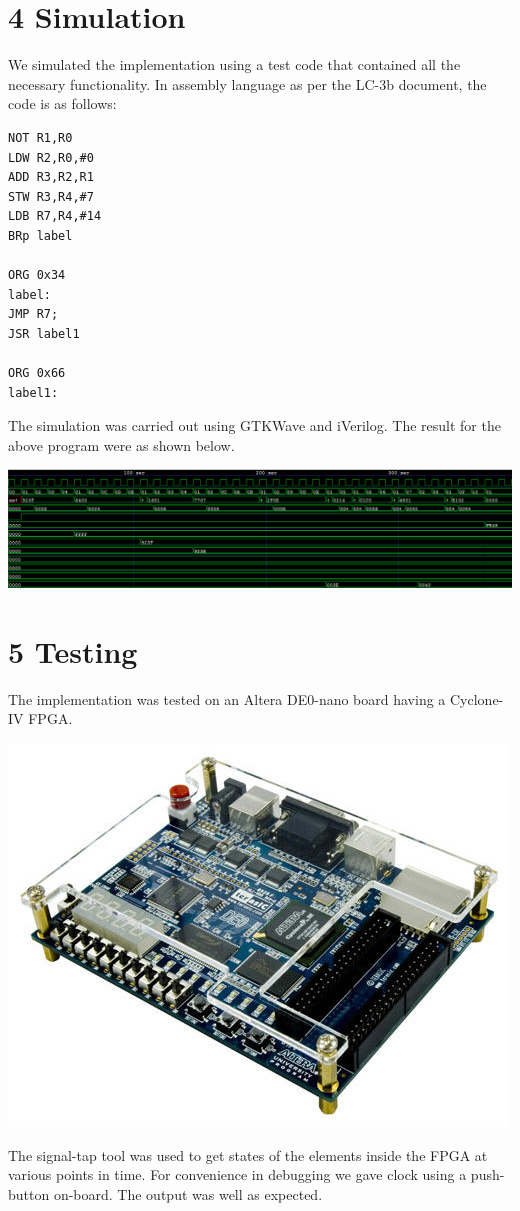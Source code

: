 \documentclass[11pt]{report}
\begin{document}
\section*{4 Simulation}
We simulated the implementation using a test code that contained all the necessary functionality. In assembly language as per the LC-3b document, the code is as follows:

\begin{lstlisting}
NOT R1,R0
LDW R2,R0,#0
ADD R3,R2,R1
STW R3,R4,#7
LDB R7,R4,#14
BRp label

ORG 0x34
label:
JMP R7;
JSR label1

ORG 0x66
label1:
\end{lstlisting}

The simulation was carried out using GTKWave and iVerilog. The result for the above program were as shown below.
\newline
\centerline{\includegraphics[scale=0.5]{gtkwave.png}}

\section*{5 Testing}
The implementation was tested on an Altera DE0-nano board having a Cyclone-IV FPGA. \newline
\centerline{\includegraphics[scale=0.5]{de0.jpg}} \newline
The signal-tap tool was used to get states of the elements inside the FPGA at various points in time. For convenience in debugging we gave clock using a push-button on-board. The output was well as expected.
\end{document}
